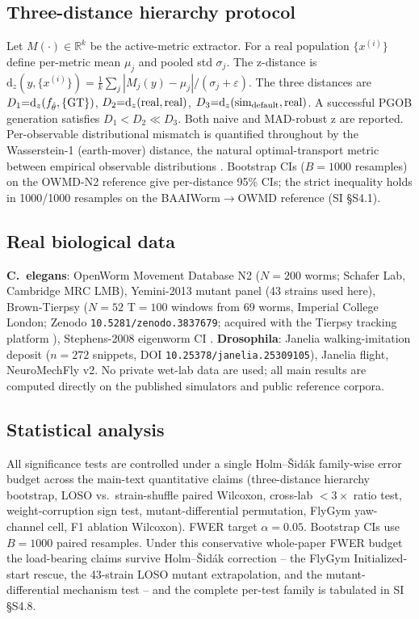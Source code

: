 \documentclass[11pt]{article}
\begin{document}
\subsection{Three-distance hierarchy protocol}
Let $M(\cdot)\in\mathbb{R}^k$ be the active-metric extractor. For a real population $\{x^{(i)}\}$ define per-metric mean $\mu_j$ and pooled std $\sigma_j$. The z-distance is $\mathrm{d}_z(y,\{x^{(i)}\})=\frac{1}{k}\sum_j|M_j(y)-\mu_j|/(\sigma_j+\varepsilon)$. The three distances are $D_1{=}\mathrm{d}_z(f_{\hat\theta},\{\rm GT\})$, $D_2{=}\mathrm{d}_z(\rm real,\rm real)$, $D_3{=}\mathrm{d}_z(\rm sim_{\rm default},\rm real)$. A successful PGOB generation satisfies $D_1{<}D_2{\ll}D_3$. Both naive and MAD-robust z are reported. Per-observable distributional mismatch is quantified throughout by the Wasserstein-1 (earth-mover) distance, the natural optimal-transport metric between empirical observable distributions \citep{peyre2019computational,cuturi2013sinkhorn}. Bootstrap CIs ($B{=}1000$ resamples) on the OWMD-N2 reference give per-distance 95\% CIs; the strict inequality holds in 1000/1000 resamples on the BAAIWorm$\to$OWMD reference (SI \S S4.1).

\subsection{Real biological data}
\textbf{C.\ elegans}: OpenWorm Movement Database N2 ($N{=}200$ worms; Schafer Lab, Cambridge MRC LMB), Yemini-2013 mutant panel \citep{yemini2013openworm} (43 strains used here), Brown-Tierpsy ($N{=}52$ T${=}100$ windows from 69 worms, Imperial College London; Zenodo \texttt{10.5281/zenodo.3837679}; acquired with the Tierpsy tracking platform \citep{javer2018open}), Stephens-2008 eigenworm CI \citep{stephens2008dimensionality}. \textbf{Drosophila}: Janelia walking-imitation deposit ($n{=}272$ snippets, DOI \texttt{10.25378/janelia.25309105}), Janelia flight, NeuroMechFly v2. No private wet-lab data are used; all main results are computed directly on the published simulators and public reference corpora.

\subsection{Statistical analysis}
\label{sec:stats}
All significance tests are controlled under a single Holm--\v{S}id\'ak family-wise error budget across the main-text quantitative claims (three-distance hierarchy bootstrap, LOSO vs.\ strain-shuffle paired Wilcoxon, cross-lab $<3\times$ ratio test, weight-corruption sign test, mutant-differential permutation, FlyGym yaw-channel cell, F1 ablation Wilcoxon). FWER target $\alpha{=}0.05$. Bootstrap CIs use $B{=}1000$ paired resamples. Under this conservative whole-paper FWER budget the load-bearing claims survive Holm--\v{S}id\'ak correction -- the FlyGym Initialized-start rescue, the 43-strain LOSO mutant extrapolation, and the mutant-differential mechanism test -- and the complete per-test family is tabulated in SI \S S4.8.
\end{document}
